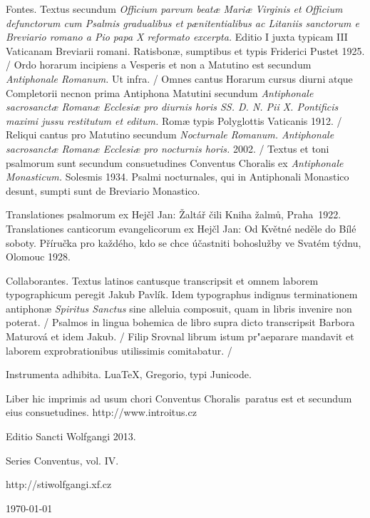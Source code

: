 \documentclass[a4paper, twoside, 12pt]{article}
\newcommand{\annusEditionis}{2013}
\begin{document}
Fontes. 
Textus secundum 
\textit{Officium parvum beatæ Mariæ Virginis et Officium
defunctorum cum Psalmis gradualibus et pænitentialibus ac Litaniis sanctorum
e Breviario romano a Pio papa X reformato excerpta.}
Editio I juxta typicam III Vaticanam Breviarii romani. 
Ratisbonæ, sumptibus et typis Friderici Pustet 1925. /
Ordo horarum incipiens a Vesperis et non a Matutino est secundum
\textit{Antiphonale Romanum.} Ut infra. /
Omnes cantus Horarum cursus diurni atque Completorii 
necnon prima Antiphona Matutini secundum
\textit{Antiphonale sacrosanctæ Romanæ Ecclesiæ pro diurnis horis
SS. D. N. Pii X. Pontificis maximi jussu restitutum et editum.}
Romæ typis Polyglottis Vaticanis 1912. /
Reliqui cantus pro Matutino secundum 
\textit{Nocturnale Romanum. Antiphonale sacrosanctæ Romanæ Ecclesiæ
pro nocturnis horis.}
2002. /
Textus et toni psalmorum sunt secundum consuetudines Conventus Choralis
ex \textit{Antiphonale Monasticum.} Solesmis 1934. Psalmi nocturnales,
qui in Antiphonali Monastico desunt, sumpti sunt de Breviario Monastico.

Translationes psalmorum ex
Hejčl Jan: Žaltář čili Kniha žalmů, Praha~1922.
Translationes canticorum evangelicorum ex Hejčl Jan: 
Od Květné neděle do Bílé soboty. Příručka pro každého, kdo se chce účastniti
bohoslužby ve Svatém týdnu, Olomouc 1928.

Collaborantes.
Textus latinos cantusque transcripsit et omnem laborem typographicum peregit
Jakub Pavlík. Idem typographus indignus terminationem antiphonæ
\textit{Spiritus Sanctus} sine alleluia composuit, quam in libris invenire
non poterat. /
Psalmos in lingua bohemica de libro supra dicto transcripsit
Barbora Maturová et idem Jakub. /
Filip Srovnal librum istum pr"aeparare mandavit et laborem exprobrationibus
utilissimis comitabatur. /

Instrumenta adhibita.
LuaTeX, %
Gregorio, %
typi Junicode. %

\begin{center}
Liber hic imprimis ad usum chori 
\guillemotright Conventus Choralis\guillemotleft\ 
paratus est
et secundum eius consuetudines.
http://www.introitus.cz

\vspace{1cm}

{\large Editio Sancti Wolfgangi \annusEditionis .}

\vspace{2mm}

Series \guillemotright Conventus\guillemotleft, vol. IV.

\vspace{1cm}

http://stiwolfgangi.xf.cz

\vfill

\today

\end{center}
\end{document}

